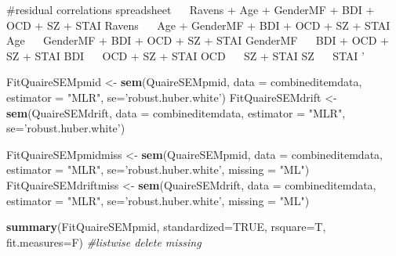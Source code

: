 \documentclass[]{article}
\newenvironment{Shaded}{\begin{snugshade}}{\end{snugshade}}
\newcommand{\KeywordTok}[1]{\textcolor[rgb]{0.13,0.29,0.53}{\textbf{#1}}}
\newcommand{\DataTypeTok}[1]{\textcolor[rgb]{0.13,0.29,0.53}{#1}}
\newcommand{\StringTok}[1]{\textcolor[rgb]{0.31,0.60,0.02}{#1}}
\newcommand{\CommentTok}[1]{\textcolor[rgb]{0.56,0.35,0.01}{\textit{#1}}}
\newcommand{\OtherTok}[1]{\textcolor[rgb]{0.56,0.35,0.01}{#1}}
\newcommand{\NormalTok}[1]{#1}
\begin{document}
\begin{Shaded}
\begin{Highlighting}[]
\StringTok{#residual correlations}
\StringTok{spreadsheet ~~ Ravens + Age + GenderMF + BDI + OCD + SZ + STAI}
\StringTok{Ravens ~~ Age  + GenderMF + BDI + OCD + SZ + STAI}
\StringTok{Age ~~  GenderMF + BDI + OCD + SZ + STAI}
\StringTok{GenderMF ~~ BDI + OCD + SZ + STAI}
\StringTok{BDI ~~ OCD + SZ + STAI}
\StringTok{OCD ~~ SZ + STAI}
\StringTok{SZ ~~ STAI}
\StringTok{'}

\NormalTok{FitQuaireSEMpmid <-}\StringTok{ }\KeywordTok{sem}\NormalTok{(QuaireSEMpmid, }\DataTypeTok{data =}\NormalTok{ combineditemdata, }\DataTypeTok{estimator =} \StringTok{"MLR"}\NormalTok{, }\DataTypeTok{se=}\StringTok{'robust.huber.white'}\NormalTok{)}
\NormalTok{FitQuaireSEMdrift <-}\StringTok{ }\KeywordTok{sem}\NormalTok{(QuaireSEMdrift, }\DataTypeTok{data =}\NormalTok{ combineditemdata, }\DataTypeTok{estimator =} \StringTok{"MLR"}\NormalTok{, }\DataTypeTok{se=}\StringTok{'robust.huber.white'}\NormalTok{)}

\NormalTok{FitQuaireSEMpmidmiss <-}\StringTok{ }\KeywordTok{sem}\NormalTok{(QuaireSEMpmid, }\DataTypeTok{data =}\NormalTok{ combineditemdata, }\DataTypeTok{estimator =} \StringTok{"MLR"}\NormalTok{, }\DataTypeTok{se=}\StringTok{'robust.huber.white'}\NormalTok{, }\DataTypeTok{missing =} \StringTok{"ML"}\NormalTok{)}
\NormalTok{FitQuaireSEMdriftmiss <-}\StringTok{ }\KeywordTok{sem}\NormalTok{(QuaireSEMdrift, }\DataTypeTok{data =}\NormalTok{ combineditemdata, }\DataTypeTok{estimator =} \StringTok{"MLR"}\NormalTok{, }\DataTypeTok{se=}\StringTok{'robust.huber.white'}\NormalTok{, }\DataTypeTok{missing =} \StringTok{"ML"}\NormalTok{)}

\KeywordTok{summary}\NormalTok{(FitQuaireSEMpmid, }\DataTypeTok{standardized=}\OtherTok{TRUE}\NormalTok{, }\DataTypeTok{rsquare=}\NormalTok{T, }\DataTypeTok{fit.measures=}\NormalTok{F) }\CommentTok{#listwise delete missing}
\end{Highlighting}
\end{Shaded}
\end{document}
